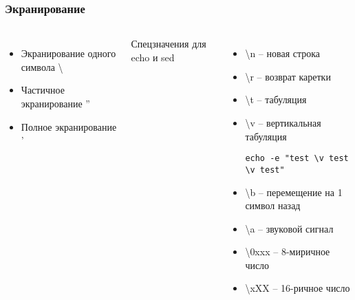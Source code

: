 \begin{frame}[fragile]
	\frametitle{Экранирование}

	\begin{columns}
		\begin{itemize}
			\item Экранирование одного символа \textbackslash 
			\item Частичное экранирование ''
			\item Полное экранирование '
		\end{itemize}
		\pause
		Спецзначения для echo и sed
		\begin{itemize}
			\item \textbackslash{n} -- новая строка
			\item \textbackslash{r} -- возврат каретки
			\item \textbackslash{t} -- табуляция
			\item \textbackslash{v} -- вертикальная табуляция \\
				\small\begin{lstlisting}
echo -e "test \v test \v test"
				\end{lstlisting}
			\item \textbackslash{b} -- перемещение на 1 символ назад
			\item \textbackslash{a} -- звуковой сигнал
			\item \textbackslash{0xxx} -- 8-миричное число
			\item \textbackslash{xXX} -- 16-ричное число
		\end{itemize}
	\end{columns}

\end{frame}
